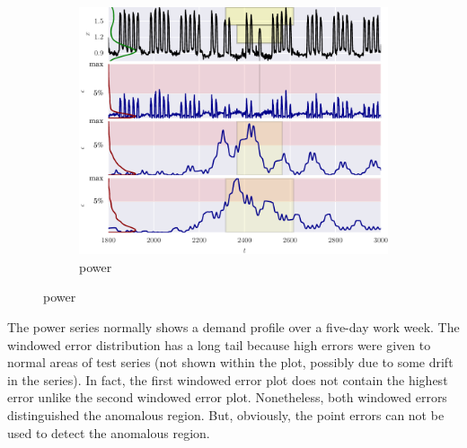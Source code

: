 \begin{figure}[H]
    \ContinuedFloat 

    \begin{subfigure}[t]{\textwidth} 
        \centering
        \includegraphics[]{figs/er_power.pdf}
        \caption{power}
    \end{subfigure}%

\end{figure}

The power series normally shows a demand profile over a five-day work week.
%
The windowed error distribution has a long tail because high errors were given to normal areas of test series (not shown within the plot, possibly due to some drift in the series).
%
In fact, the first windowed error plot does not contain the highest error unlike the second windowed error plot.
%
Nonetheless, both windowed errors distinguished the anomalous region.
%
But, obviously, the point errors can not be used to detect the anomalous region.


 \nopagebreak

